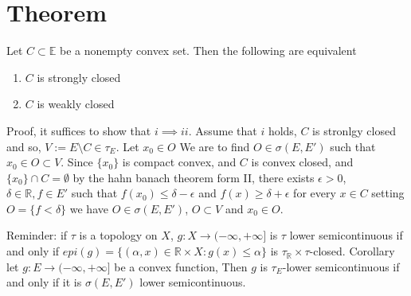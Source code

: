 \documentclass[11pt]{article}
\begin{document}
\section{Theorem}
Let $C \subset \mathbb{E}$ be a nonempty convex set. Then the following are equivalent
\begin{enumerate}
    \item $C$ is strongly closed
    \item $C$ is weakly closed
\end{enumerate}
Proof, it suffices to show that $i \implies ii$.
Assume that  $i$ holds, $C$ is stronlgy closed and so, $V := E \setminus C \in \tau_E$. Let $x_0 \in O$
We are to find $O \in \sigma(E, E')$ such that $x_0 \in O \subset V$. Since $\{x_0\}$ is compact convex, and $C$ is convex closed, and $\{x_0\} \cap C = \emptyset$ by 
the hahn banach theorem form II, there exists $\epsilon > 0$, $\delta \in \mathbb{R}, f \in E'$ such that
$f(x_0) \le \delta - \epsilon$ and $f(x) \ge \delta + \epsilon$ for every $x \in C$ setting   $O = \{f < \delta\}$ we have $O \in \sigma(E, E')$, $O \subset V$ and $x_0 \in O$.

Reminder: if $\tau$ is a topology on $X$, $g : X \rightarrow (-\infty, +\infty]$ is $\tau$ lower semicontinuous 
if and only if $epi(g) = \{(\alpha,x) \in \mathbb{R} \times X: g(x) \le \alpha\}$ is $ \tau_{ \mathbb{R}} \times \tau$-closed.
Corollary let $g: E \rightarrow (-\infty, +\infty]$ be a convex function, Then  $g$ is $\tau_E$-lower semicontinuous if and only if it is  $\sigma(E, E')$ lower semicontinuous.
\end{document}
